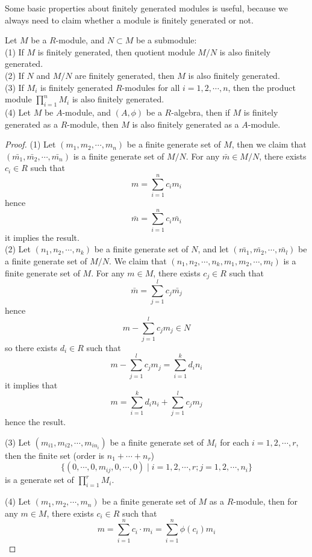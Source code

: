 Some basic properties about finitely generated modules is useful, because we always need to claim whether a module is finitely generated or not.
\begin{proposition} \label{typefini}
Let \(M\) be a \(R\)-module, and \(N \subset M\) be a submodule:\\
(1) If \(M\) is finitely generated, then quotient module \(M/N\) is also finitely generated.\\

(2) If \(N\) and \(M/N\) are finitely generated, then \(M\) is also finitely generated.\\

(3) If \(M_i\) is finitely generated \(R\)-modules for all \(i=1,2,\cdots, n\), then the product module \(\prod_{i=1}^n M_i\) is also finitely generated.\\

(4) Let \(M\) be \(A\)-module, and \((A,\phi)\) be a \(R\)-algebra, then if \(M\) is finitely generated as a \(R\)-module, then \(M\) is also finitely generated as a \(A\)-module.
\end{proposition}
\begin{proof}
    (1) Let \((m_1, m_2, \cdots, m_n)\) be a finite generate set of \(M\), then we claim that \((\bar{m_1}, \bar{m_2}, \cdots, \bar{m_n})\) is a finite generate set of \(M/N\). For any \(\bar{m} \in M/N\), there exists \(c_i \in R\) such that
    \[m = \sum_{i=1}^n c_i m_i\]
    hence
    \[\bar{m} = \sum_{i=1}^n c_i \bar{m_i}\]
    it implies the result.\\
    (2) Let \((n_1, n_2, \cdots, n_k)\) be a finite generate set of \(N\), and let \((\bar{m_1}, \bar{m_2}, \cdots, \bar{m_l})\) be a finite generate set of \(M/N\). We claim that \((n_1, n_2, \cdots, n_k, m_1, m_2, \cdots, m_l)\) is a finite generate set of \(M\). For any \(m \in M\), there exists \(c_j \in R\) such that
    \[\bar{m} = \sum_{j=1}^l c_j \bar{m_j}\]
    hence
    \[m - \sum_{j=1}^l c_j m_j \in N\]
    so there exists \(d_i \in R\) such that
    \[m - \sum_{j=1}^l c_j m_j = \sum_{i=1}^k d_i n_i\]
    it implies that
    \[m = \sum_{i=1}^k d_i n_i + \sum_{j=1}^l c_j m_j\]
    hence the result.

    (3) Let \((m_{i1}, m_{i2}, \cdots, m_{in_i})\) be a finite generate set of \(M_i\) for each \(i=1,2,\cdots,r\), then the finite set (order is \(n_1+\cdots+n_r\))
    \[\{(0,\cdots,0,m_{ij},0,\cdots,0) \mid i=1,2,\cdots,r; j=1,2,\cdots,n_i\}\]
    is a generate set of \(\prod_{i=1}^r M_i\).

    (4) Let \((m_1, m_2, \cdots, m_n)\) be a finite generate set of \(M\) as a \(R\)-module, then for any \(m \in M\), there exists \(c_i \in R\) such that
    \[m = \sum_{i=1}^n c_i \cdot m_i = \sum_{i=1}^n \phi(c_i) m_i\]
\end{proof}

